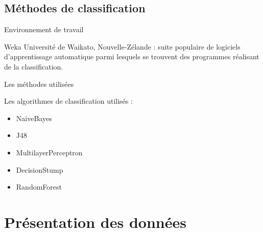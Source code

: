 \documentclass{beamer}
\begin{document}
\subsection{Méthodes de classification}
\begin{frame}{Environnement de travail}

\begin{block}{Weka}
Université de Waikato, Nouvelle-Zélande : suite populaire de logiciels d'apprentissage automatique parmi lesquels se trouvent des programmes réalisant de la classification.
\end{block}

\end{frame}



\begin{frame}{Les méthodes utilisées}

Les algorithmes de classification utilisés :
\begin{itemize}
  \item NaiveBayes
  \item J48
  \item MultilayerPerceptron
  \item DecisionStump
  \item RandomForest
\end{itemize}

\end{frame}





\section{Présentation des données}
\end{document}
